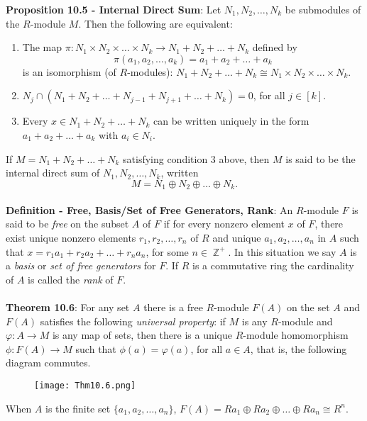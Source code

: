 \documentclass{article}
\DeclareMathOperator{\Z}{\mathbb{Z}}
\begin{document}
\textbf{Proposition 10.5 - Internal Direct Sum}: Let $N_1, N_2, \dots, N_k$ be submodules of the $R$-module $M$. Then the following are equivalent: \begin{enumerate}
    \item The map $\pi: N_1 \times N_2 \times \dots \times N_k \rightarrow N_1 + N_2 + \dots + N_k$ defined by $$\pi(a_1, a_2, \dots, a_k) = a_1 + a_2 + \dots + a_k$$ is an isomorphism (of $R$-modules): $N_1 + N_2 + \dots + N_k \cong N_1 \times N_2 \times \dots \times N_k$.
    \item $N_j \cap (N_1 + N_2 + \dots + N_{j - 1} + N_{j + 1} + \dots + N_k) = 0$, for all $j \in [k]$.
    \item Every $x \in N_1 + N_2 + \dots + N_k$ can be written uniquely in the form $a_1 + a_2 + \dots + a_k$ with $a_i \in N_i$.
\end{enumerate} If $M = N_1 + N_2 + \dots + N_k$ satisfying condition 3 above, then $M$ is said to be the internal direct sum of $N_1, N_2, \dots, N_k$, written $$M = N_1 \oplus N_2 \oplus \dots \oplus N_k.$$ \\
\textbf{Definition - Free, Basis/Set of Free Generators, Rank}: An $R$-module $F$ is said to be \textit{free} on the subset $A$ of $F$ if for every nonzero element $x$ of $F$, there exist unique nonzero elements $r_1, r_2, \dots, r_n$ of $R$ and
unique $a_1, a_2, \dots, a_n$ in $A$ such that $x = r_1 a_1 + r_2 a_2 + \dots + r_n a_n$, for some $n \in \Z^+$. In this situation we say $A$ is a \textit{basis} or \textit{set of free generators} for $F$. If $R$ is a commutative ring the cardinality of $A$ is called the \textit{rank} of $F$. \\ \\
\textbf{Theorem 10.6}: For any set $A$ there is a free $R$-module $F(A)$ on the set $A$ and $F(A)$ satisfies the following \textit{universal property}: if $M$ is any $R$-module and $\varphi: A \rightarrow M$ is any map of sets, then there is a unique $R$-module homomorphism $\phi: F(A) \rightarrow M$ such that
$\phi(a) = \varphi(a)$, for all $a \in A$, that is, the following diagram commutes. \vspace{-4mm} \begin{figure}[H]
\begin{center}
\texttt{[image: Thm10.6.png]}
\end{center}
\end{figure} \vspace{-5mm} \noindent When $A$ is the finite set $\{a_1, a_2, \dots, a_n\}$, $F(A) = Ra_1 \oplus Ra_2 \oplus \dots \oplus Ra_n \cong R^n.$ \\ \\
\end{document}
